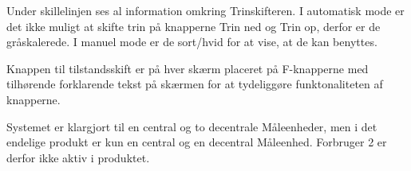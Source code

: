 Under skillelinjen ses al information omkring Trinskifteren. I automatisk mode er det ikke muligt at skifte trin på knapperne Trin ned og Trin op, derfor er de gråskalerede. I manuel mode er de sort/hvid for at vise, at de kan benyttes.


Knappen til tilstandsskift er på hver skærm placeret på F-knapperne med tilhørende forklarende tekst på skærmen for at tydeliggøre funktonaliteten af knapperne.


Systemet er klargjort til en central og to decentrale Måleenheder, men i det endelige produkt er kun en central og en decentral Måleenhed. Forbruger 2 er derfor ikke aktiv i produktet.